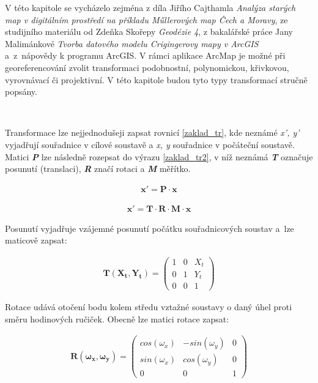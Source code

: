 \documentclass[thesis=M,czech]{FITthesis}[2012/06/26]
\begin{document}
V této kapitole se vycházelo zejména z díla Jiřího Cajthamla \textit{Analýza starých map v digitálním prostředí na příkladu Műllerových map Čech a Moravy}, ze studijního materiálu od Zdeňka Skořepy \textit{Geodézie 4}, z bakalářské práce Jany Malimánkové \textit{Tvorba datového modelu Crigingerovy mapy v ArcGIS} a~z~nápovědy k programu ArcGIS. V rámci aplikace ArcMap je možné při georeferencování zvolit transformaci podobnostní, polynomickou, křivkovou, vyrovnávací či projektivní. V této kapitole budou tyto typy transformací stručně popsány. \cite{transformace} \cite{skorepa} \cite{gis_transformace} \cite{vugtk} \cite{malimankova}

\

Transformace lze nejjednodušeji zapsat rovnicí \eqref{zaklad_tr}, kde neznámé \textit{x', y'} vyjadřují souřadnice v cílové soustavě a \textit{x, y} souřadnice v počáteční soustavě. Matici \textbf{\textit{P}} lze následně rozepsat do výrazu \eqref{zaklad_tr2}, v níž neznámá \textbf{\textit{T}} označuje posunutí (translaci), \textbf{\textit{R}} značí rotaci a \textbf{\textit{M}} měřítko.

\begin{align}\label{zaklad_tr}
\textbf{x}' = \textbf{P} \cdot \textbf{x}
\end{align}

\begin{align}\label{zaklad_tr2}
\textbf{x}' = \textbf{T} \cdot \textbf{R} \cdot \textbf{M} \cdot \textbf{x}
\end{align}

Posunutí vyjadřuje vzájemné posunutí počátku souřadnicových soustav a~lze maticově zapsat:

\begin{align} \label{matT}
\boldsymbol {T (X_t, Y_t)}= \begin{pmatrix}
    1 & 0 & X_t \\
    0 & 1 & Y_t \\
    0 & 0 & 1 
\end{pmatrix}
\end{align}

Rotace udává otočení bodu kolem středu vztažné soustavy o daný úhel proti směru hodinových ručiček. Obecně lze matici rotace zapsat:

\begin{align} \label{matR}
\boldsymbol {R (\omega_x, \omega_y) }= \begin{pmatrix}
    cos(\omega_x) & -sin(\omega_y) & 0 \\
    sin(\omega_x) & cos(\omega_y) & 0 \\
    0 & 0 & 1 
\end{pmatrix}
\end{align}
\end{document}
